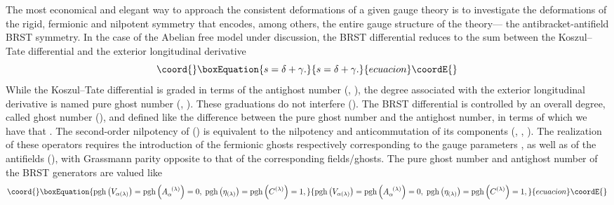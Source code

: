 \documentclass[a4paper,11pt]{article}
\begin{document}
The most economical and elegant way to approach the consistent deformations
of a given gauge theory is to investigate the deformations of the rigid,
fermionic and nilpotent symmetry that encodes, among others, the entire
gauge structure of the theory--- the antibracket-antifield BRST symmetry. In
the case of the Abelian free model under discussion, the BRST differential \coordHE{} reduces to the sum between the Koszul--Tate differential \myHighlight{$\delta $}\coordHE{} and
the exterior longitudinal derivative \myHighlight{$\gamma $}\coordHE{}%
\begin{equation}\coord{}\boxEquation{
s=\delta +\gamma .  \label{bf38}
}{
s=\delta +\gamma .  }{ecuacion}\coordE{}\end{equation}
While the Koszul--Tate differential is graded in terms of the antighost
number (\coordHE{}, \coordHE{}), the degree
associated with the exterior longitudinal derivative is named pure ghost
number (\coordHE{}, \coordHE{}). These
graduations do not interfere (\coordHE{}). The BRST differential is controlled by an
overall degree, called ghost number (\coordHE{}), and defined like the
difference between the pure ghost number and the antighost number, in terms
of which we have that \coordHE{}. The second-order nilpotency
of \coordHE{} (\coordHE{}) is equivalent to the nilpotency and anticommutation of
its components (\coordHE{}, \coordHE{}, \coordHE{}). The realization of these operators requires the introduction of
the fermionic ghosts \coordHE{}
respectively corresponding to the gauge parameters \myHighlight{$\left( \epsilon
_{(\lambda )}^{\prime },\epsilon ^{(\lambda )}\right) $}\coordHE{}, as well as of the
antifields (\coordHE{}), with Grassmann parity opposite to that
of the corresponding fields/ghosts. The pure ghost number and antighost
number of the BRST generators are valued like
\begin{equation}\coord{}\boxEquation{
\mathrm{pgh}\left( V_{\alpha (\lambda )}\right) =\mathrm{pgh}\left(
A_{\alpha }^{\;\;(\lambda )}\right) =0,\;\mathrm{pgh}\left( \eta _{(\lambda
)}\right) =\mathrm{pgh}\left( C^{(\lambda )}\right) =1,  \label{bf39}
}{
\mathrm{pgh}\left( V_{\alpha (\lambda )}\right) =\mathrm{pgh}\left(
A_{\alpha }^{\;\;(\lambda )}\right) =0,\;\mathrm{pgh}\left( \eta _{(\lambda
)}\right) =\mathrm{pgh}\left( C^{(\lambda )}\right) =1,  }{ecuacion}\coordE{}\end{equation}
\end{document}
